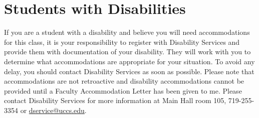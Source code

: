 \documentclass[11pt]{article}
\begin{document}
\section*{Students with Disabilities}

If you are a student with a disability and believe you will need accommodations for this class, it is your responsibility to register with Disability Services and provide them with documentation of your disability. They will work with you to determine what accommodations are appropriate for your situation. To avoid any delay, you should contact Disability Services as soon as possible. Please note that accommodations are not retroactive and disability accommodations cannot be provided until a Faculty Accommodation Letter has been given to me. Please contact Disability Services for more information at Main Hall room 105, 719-255-3354 or \href{mailto:dservice@uccs.edu}{dservice@uccs.edu}.
\end{document}

